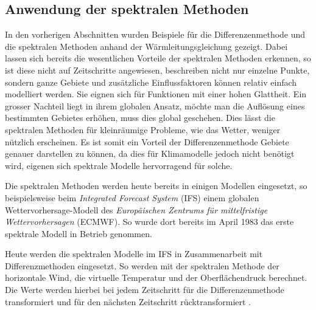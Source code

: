 \begin{refsection}
\subsection{Anwendung der spektralen Methoden}
In den vorherigen Abschnitten wurden Beispiele für die Differenzenmethode
und die spektralen Methoden anhand der Wärmleitungsgleichung gezeigt.
Dabei lassen sich bereits die wesentlichen Vorteile der spektralen
Methoden erkennen, so ist diese nicht auf Zeitschritte angewiesen,
beschreiben nicht nur einzelne Punkte, sondern ganze Gebiete und
zusätzliche Einflussfaktoren können relativ einfach modelliert
werden. Sie eignen sich für Funktionen mit einer hohen Glattheit.
Ein grosser Nachteil liegt in ihrem globalen Ansatz, möchte man die
Auflösung eines bestimmten Gebietes erhöhen, muss dies global
geschehen. Dies lässt die spektralen Methoden für kleinräumige
Probleme, wie das Wetter, weniger nützlich erscheinen. Es ist somit
ein Vorteil der Differenzenmethode Gebiete genauer darstellen zu
können, da dies für Klimamodelle jedoch nicht benötigt wird, eigenen
sich spektrale Modelle hervorragend für solche.
 
Die spektralen Methoden
%
werden heute
bereits in einigen Modellen eingesetzt, so beispielsweise beim {\em
Integrated Forecast System} (IFS)
%
einem globalen Wettervorhersage-Modell des {\em Europäischen Zentrums
für mittelfristige Wettervorhersagen} (ECMWF).
%
So wurde dort bereits
im April 1983 das erste spektrale Modell in Betrieb genommen.

Heute werden die spektralen Modelle im IFS in Zusammenarbeit mit
Differenzmethoden eingesetzt. So werden mit der spektralen Methode
der horizontale Wind, die virtuelle Temperatur und der Oberflächendruck
berechnet. Die Werte werden hierbei bei jedem Zeitschritt für die
Differenzenmethode transformiert und für den nächsten Zeitschritt
rücktransformiert \cite{klima:ecmwf}.


\printbibliography[heading=subbibliography]
\end{refsection}
